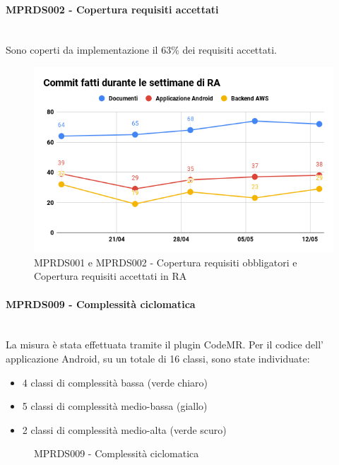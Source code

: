 \paragraph{MPRDS002 - Copertura requisiti accettati}\mbox{}\\[0.4cm]
Sono coperti da implementazione il 63\% dei requisiti accettati.
\begin{figure}[H]
	\centering
	\includegraphics[width=13cm,keepaspectratio]{../includes/pics/CoperturaRA.png}
	\caption{\label{fig:mission}MPRDS001 e MPRDS002 - Copertura requisiti obbligatori e Copertura requisiti accettati in RA}
\end{figure}
\paragraph{MPRDS009 - Complessità ciclomatica}\mbox{}\\[0.4cm]
La misura è stata effettuata tramite il plugin CodeMR. Per il codice dell' applicazione Android, su un totale di 16 classi, sono state individuate: \begin{itemize}
	\item 4 classi di complessità bassa (verde chiaro)
	\item 5 classi di complessità medio-bassa (giallo)
	\item 2 classi di complessità medio-alta (verde scuro)
\end{itemize}
\begin{figure}[H]
	\centering
	\caption{\label{fig:mission}MPRDS009 - Complessità ciclomatica}
\end{figure}
